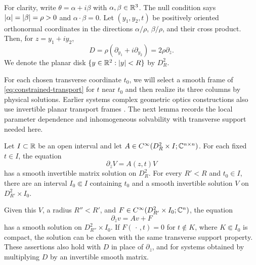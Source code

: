 For clarity, write $\theta=\alpha+i\beta$ with
$\alpha,\beta\in\mathbb R^3$. The null condition says
$\left\lvert \alpha\right\rvert=\left\lvert \beta\right\rvert=\rho>0$ and $\alpha\cdot\beta=0$.
Let $(y_1,y_2,t)$ be positively oriented orthonormal coordinates in
the directions $\alpha/\rho$, $\beta/\rho$, and their cross product.
Then, for $z=y_1+iy_2$,
\[
 D=\rho(\partial_{y_1}+i\partial_{y_2})
    =2\rho\partial_{\overline z}.
\]
We denote the planar disk $\{y\in\mathbb R^2:\left\lvert y\right\rvert<R\}$ by $D_R^2$.

For each chosen transverse coordinate $t_0$, we will select a smooth
frame of \eqref{eq:constrained-transport} for $t$ near $t_0$ and then
realize its three columns by physical solutions.
Earlier systems complex geometric optics constructions also use
invertible planar transport frames \cite[Section~1]{EskinRalston2004}.
The next lemma records the local parameter dependence and inhomogeneous
solvability with transverse support needed here.

\begin{lemma}
\label{lem:planar-frames}
Let $I\subset\mathbb R$ be an open interval and let
$A\in C^\infty(D_R^2\times I;\mathbb C^{n\times n})$.
For each fixed $t\in I$, the equation
\begin{equation}
\label{eq:planar-frame-equation}
 \partial_{\overline z}V=A(z,t)V
\end{equation}
has a smooth invertible matrix solution on $D_R^2$.
For every $R'<R$ and $t_0\in I$, there are an interval
$I_0\Subset I$ containing $t_0$ and a smooth invertible solution
$V$ on $D_{R'}^2\times I_0$.

Given this $V$, a radius $R''<R'$, and
$F\in C^\infty(D_{R'}^2\times I_0;\mathbb C^n)$, the equation
\begin{equation}
\label{eq:planar-inhomogeneous}
 \partial_{\overline z}v=Av+F
\end{equation}
has a smooth solution on $D_{R''}^2\times I_0$. If
$F(\,\cdot\,,t)=0$ for $t\notin K$, where $K\Subset I_0$ is
compact, the solution can be chosen with the same transverse
support property. These assertions also hold with $D$ in place of
$\partial_{\overline z}$, and for systems obtained by multiplying
$D$ by an invertible smooth matrix.
\end{lemma}

